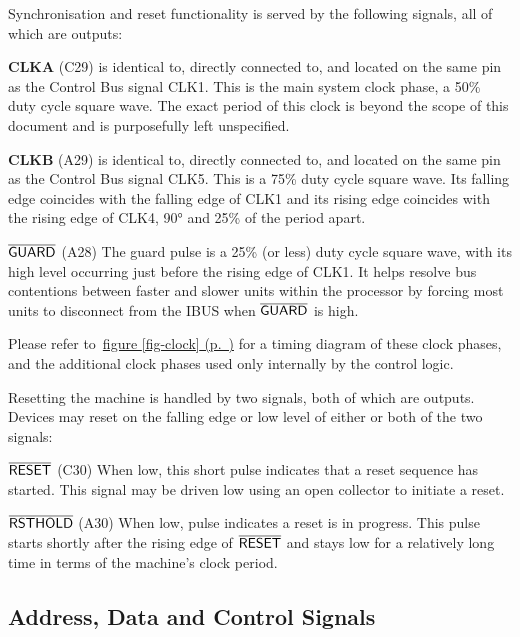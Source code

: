 \documentclass[11pt,a4paper,twocolumns]{article}
\newcommand{\cf}[2][section]{\hyperref[#2]{#1 \ref*{#2} (p.~\pageref*{#2})}}
\newcommand{\fcf}[1]{\cf[figure]{#1}}
\newcommand{\ns}[1]{$\overline{\mbox{\textsf{{#1}}}}$}
\newcommand{\ps}[1]{\textsf{#1}}
\newcommand\bus[1]{{#1}}
\newcommand\IBUS{\bus{IBUS}}
\newcommand\GUARDPULSE{\ns{GUARD}}
\newcommand\GP{\GUARDPULSE}
\newcommand\CLOCK[1]{\ps{CLK{#1}}}
\newcommand\RSTHOLD{\ns{RSTHOLD}}
\newcommand\RESET{\ns{RESET}}
\begin{document}
Synchronisation and reset functionality is served by the following
signals, all of which are outputs:

\begin{description}
  \item{\bf \CLOCK{A}} (C29) is identical to, directly connected to,
    and located on the same pin as the Control Bus signal
    \CLOCK{1}. This is the main system clock phase, a 50\% duty cycle
    square wave. The exact period of this clock is beyond the scope of
    this document and is purposefully left unspecified.
  \item{\bf \CLOCK{B}} (A29) is identical to, directly connected to,
    and located on the same pin as the Control Bus signal
    \CLOCK{5}. This is a 75\% duty cycle square wave. Its falling edge
    coincides with the falling edge of \CLOCK{1} and its rising edge
    coincides with the rising edge of \CLOCK{4}, 90° and 25\% of the
    period apart.
  \item{\bf\GP} (A28) The guard pulse is a 25\% (or
    less) duty cycle square wave, with its high level occurring just
    before the rising edge of \CLOCK{1}. It helps resolve bus
    contentions between faster and slower units within the processor
    by forcing most units to disconnect from the \IBUS{} when \GP{} is
    high.
\end{description}

Please refer to~\fcf{fig-clock} for a timing diagram of these clock
phases, and the additional clock phases used only internally by the
control logic.

Resetting the machine is handled by two signals, both of which are
outputs. Devices may reset on the falling edge or low level of either
or both of the two signals:

\begin{description}
  \item{\bf\RESET} (C30) When low, this short pulse indicates that a
    reset sequence has started. This signal may be driven low using an
    open collector to initiate a reset.
  \item{\bf\RSTHOLD} (A30) When low, pulse indicates a reset is in
    progress. This pulse starts shortly after the rising edge of
    \RESET{} and stays low for a relatively long time in terms of the
    machine's clock period.
\end{description}

\subsection{Address, Data and Control Signals}
\end{document}
